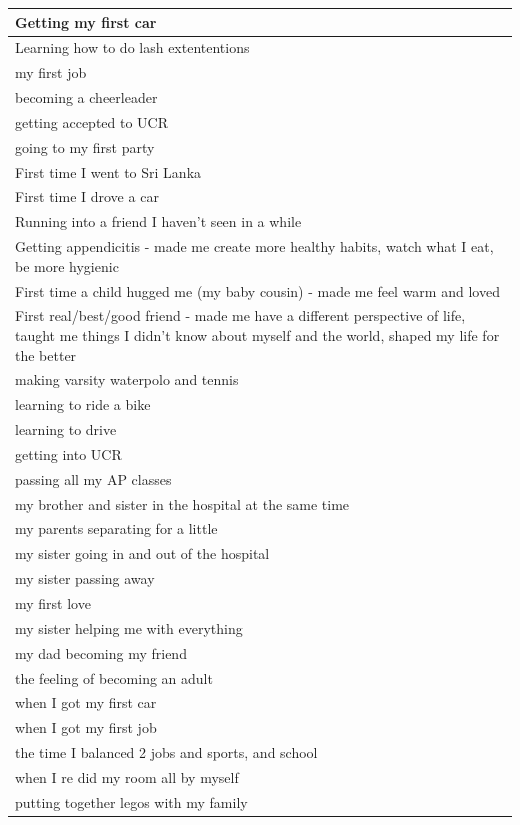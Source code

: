 \documentclass[
  .7em,
  letterpaper,
  DIV=11,
  numbers=noendperiod]{scrartcl}
\begin{document}
\begin{table}
\begin{tabular}{l}
\hline
Getting my first car\\
\hline
Learning how to do lash extententions\\
\hline
my first job\\
\hline
becoming a cheerleader\\
\hline
getting accepted to UCR\\
\hline
going to my first party\\
\hline
First time I went to Sri Lanka\\
\hline
First time I drove a car\\
\hline
Running into a friend I haven't seen in a while\\
\hline
Getting appendicitis - made me create more healthy habits, watch what I eat, be more hygienic\\
\hline
First time a child hugged me (my baby cousin) - made me feel warm and loved\\
\hline
First real/best/good friend - made me have a different perspective of life, taught me things I didn't know about myself and the world, shaped my life for the better\\
\hline
making varsity waterpolo and tennis\\
\hline
learning to ride a bike\\
\hline
learning to drive\\
\hline
getting into UCR\\
\hline
passing all my AP classes\\
\hline
my brother and sister in the hospital at the same time\\
\hline
my parents separating for a little\\
\hline
my sister going in and out of the hospital\\
\hline
my sister passing away\\
\hline
my first love\\
\hline
my sister helping me with everything\\
\hline
my dad becoming my friend\\
\hline
the feeling of becoming an adult\\
\hline
when I got my first car\\
\hline
when I got my first job\\
\hline
the time I balanced 2 jobs and sports, and school\\
\hline
when I re did my room all by myself\\
\hline
putting together legos with my family\\

\end{tabular}
\end{table}
\end{document}
